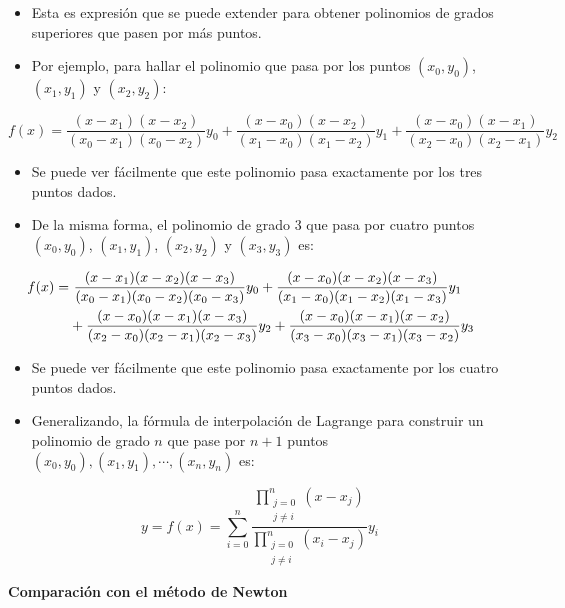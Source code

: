 \documentclass[]{book}
\providecommand{\tightlist}{%
  \setlength{\itemsep}{0pt}\setlength{\parskip}{0pt}}
\begin{document}
\begin{itemize}
\tightlist
\item
  Esta es expresión que se puede extender para obtener polinomios de grados superiores que pasen por más puntos.
\item
  Por ejemplo, para hallar el polinomio que pasa por los puntos \((x_0, y_0)\), \((x_1, y_1)\) y \((x_2, y_2)\):
\end{itemize}

\[
f(x) = \frac{(x - x_1)(x - x_2)}{(x_0 - x_1)(x_0 - x_2)} y_0 + \frac{(x - x_0)(x - x_2)}{(x_1 - x_0)(x_1 - x_2)} y_1 + \frac{(x - x_0)(x - x_1)}{(x_2 - x_0)(x_2 - x_1)} y_2
\]

\begin{itemize}
\item
  Se puede ver fácilmente que este polinomio pasa exactamente por los tres puntos dados.
\item
  De la misma forma, el polinomio de grado 3 que pasa por cuatro puntos \((x_0, y_0)\), \((x_1, y_1)\), \((x_2, y_2)\) y \((x_3, y_3)\) es:
\end{itemize}

\[
\hspace{-0.5cm}
\begin{split}
f(x) = &~ \frac{(x - x_1)(x - x_2)(x - x_3)}{(x_0 - x_1)(x_0 - x_2)(x_0 - x_3)} y_0 + \frac{(x - x_0)(x - x_2)(x - x_3)}{(x_1 - x_0)(x_1 - x_2)(x_1 - x_3)} y_1 \\
& + \frac{(x - x_0)(x - x_1)(x - x_3)}{(x_2 - x_0)(x_2 - x_1)(x_2 - x_3)} y_2 + \frac{(x - x_0)(x - x_1)(x - x_2)}{(x_3 - x_0)(x_3 - x_1)(x_3 - x_2)} y_3
\end{split}
\]

\begin{itemize}
\item
  Se puede ver fácilmente que este polinomio pasa exactamente por los cuatro puntos dados.
\item
  Generalizando, la fórmula de interpolación de Lagrange para construir un polinomio de grado \(n\) que pase por \(n+1\) puntos \((x_0, y_0), (x_1, y_1), \cdots, (x_n, y_n)\) es:
\end{itemize}

\[
y = f(x) = \sum_{i = 0}^n \frac{\prod\limits_{\substack{j = 0\\ j \neq i}}^n (x - x_j)}{\prod\limits_{\substack{j = 0\\ j \neq i}}^n (x_i - x_j)} y_i
\]

\textbf{Comparación con el método de Newton}
\end{document}
